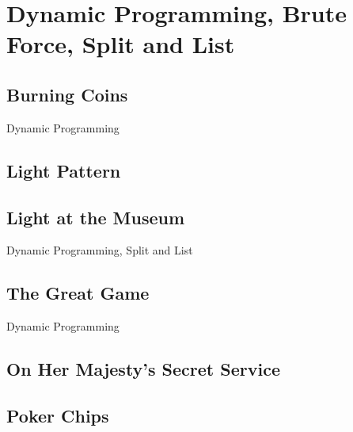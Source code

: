 \documentclass[10pt,a4paper,twoside]{report}
\begin{document}
\section{Dynamic Programming, Brute Force, Split and List}

\subsection*{Burning Coins}
\begin{keywords}Dynamic Programming\end{keywords}


\newpage
\subsection*{Light Pattern}
\begin{keywords}\end{keywords}


\newpage
\subsection*{Light at the Museum}
\begin{keywords}Dynamic Programming, Split and List\end{keywords}


\newpage
\subsection*{The Great Game}
\begin{keywords}Dynamic Programming\end{keywords}


\newpage
\subsection*{On Her Majesty's Secret Service}
\begin{keywords}\end{keywords}


\newpage
\subsection*{Poker Chips}
\begin{keywords}\end{keywords}

\end{document}
